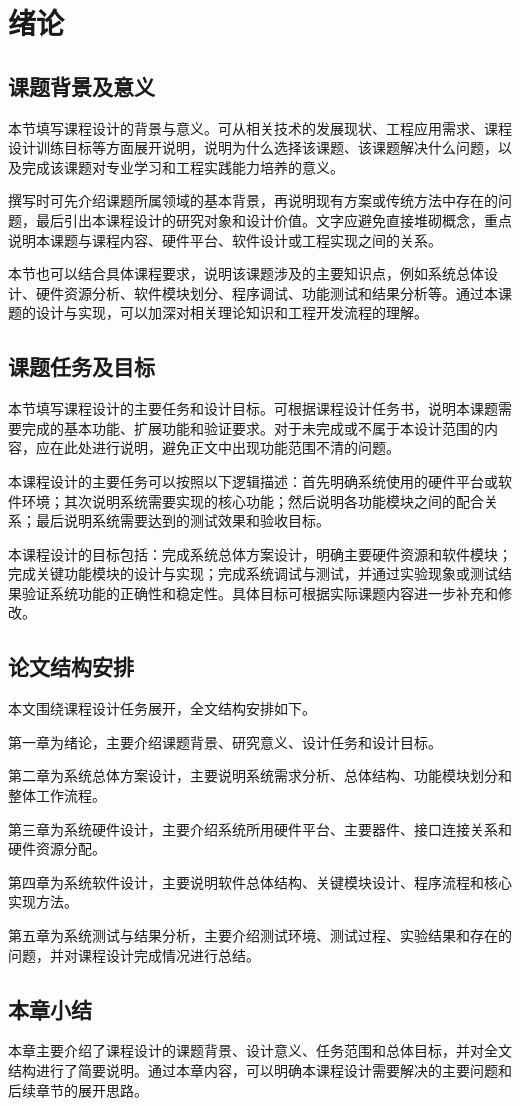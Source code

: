 \chapter{绪论}

\section{课题背景及意义}

本节填写课程设计的背景与意义。可从相关技术的发展现状、工程应用需求、课程设计训练目标等方面展开说明，说明为什么选择该课题、该课题解决什么问题，以及完成该课题对专业学习和工程实践能力培养的意义。

撰写时可先介绍课题所属领域的基本背景，再说明现有方案或传统方法中存在的问题，最后引出本课程设计的研究对象和设计价值。文字应避免直接堆砌概念，重点说明本课题与课程内容、硬件平台、软件设计或工程实现之间的关系。

本节也可以结合具体课程要求，说明该课题涉及的主要知识点，例如系统总体设计、硬件资源分析、软件模块划分、程序调试、功能测试和结果分析等。通过本课题的设计与实现，可以加深对相关理论知识和工程开发流程的理解。

\section{课题任务及目标}

本节填写课程设计的主要任务和设计目标。可根据课程设计任务书，说明本课题需要完成的基本功能、扩展功能和验证要求。对于未完成或不属于本设计范围的内容，应在此处进行说明，避免正文中出现功能范围不清的问题。

本课程设计的主要任务可以按照以下逻辑描述：首先明确系统使用的硬件平台或软件环境；其次说明系统需要实现的核心功能；然后说明各功能模块之间的配合关系；最后说明系统需要达到的测试效果和验收目标。

本课程设计的目标包括：完成系统总体方案设计，明确主要硬件资源和软件模块；完成关键功能模块的设计与实现；完成系统调试与测试，并通过实验现象或测试结果验证系统功能的正确性和稳定性。具体目标可根据实际课题内容进一步补充和修改。

\section{论文结构安排}

本文围绕课程设计任务展开，全文结构安排如下。

第一章为绪论，主要介绍课题背景、研究意义、设计任务和设计目标。

第二章为系统总体方案设计，主要说明系统需求分析、总体结构、功能模块划分和整体工作流程。

第三章为系统硬件设计，主要介绍系统所用硬件平台、主要器件、接口连接关系和硬件资源分配。

第四章为系统软件设计，主要说明软件总体结构、关键模块设计、程序流程和核心实现方法。

第五章为系统测试与结果分析，主要介绍测试环境、测试过程、实验结果和存在的问题，并对课程设计完成情况进行总结。

\section{本章小结}

本章主要介绍了课程设计的课题背景、设计意义、任务范围和总体目标，并对全文结构进行了简要说明。通过本章内容，可以明确本课程设计需要解决的主要问题和后续章节的展开思路。